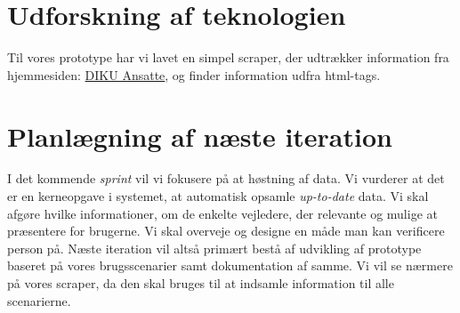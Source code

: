 \documentclass[11pt]{article}
\begin{document}
\section{Udforskning af teknologien}

Til vores prototype har vi lavet en simpel scraper, der udtrækker information fra hjemmesiden: \href{http://www.diku.dk/Ansatte}{DIKU Ansatte}, og finder information udfra html-tags.

\section{Planlægning af næste iteration}
I det kommende \textit{sprint} vil vi fokusere på at høstning af data. Vi vurderer at det er en kerneopgave i systemet, at automatisk opsamle \textit{up-to-date} data. Vi skal afgøre hvilke informationer, om de enkelte vejledere, der relevante og mulige at præsentere for brugerne.
Vi skal overveje og designe en måde man kan verificere person på.
Næste iteration vil altså primært bestå af udvikling af prototype baseret på vores brugsscenarier samt dokumentation af samme. Vi vil se nærmere på vores scraper, da den skal bruges til at indsamle information til alle scenarierne.
\end{document}
